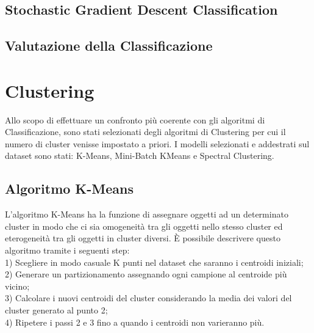 \documentclass[12pt,oneside]{article}
\begin{document}
    \begin{enumerate}
    \subsection{Stochastic Gradient Descent Classification}
    \end{enumerate}

   
    
    \begin{enumerate}
    \subsection{Valutazione della Classificazione}
    \end{enumerate}


\section{Clustering}
    \begin{justify}
        Allo scopo di effettuare un confronto più coerente con gli algoritmi di Classificazione, sono stati selezionati degli algoritmi di Clustering per cui il numero di cluster venisse impostato a priori. I modelli selezionati e addestrati sul dataset sono stati: K-Means, Mini-Batch KMeans e Spectral Clustering.
    \end{justify}
    \begin{enumerate}
    \subsection{Algoritmo K-Means}
    \begin{justify}
        L'algoritmo K-Means ha la funzione di assegnare oggetti ad un determinato cluster in modo che ci sia omogeneità tra gli oggetti nello stesso cluster ed eterogeneità tra gli oggetti in cluster diversi. È possibile descrivere questo algoritmo tramite i seguenti step:\\
    1) Scegliere in modo casuale K punti nel dataset che saranno i centroidi iniziali;\\
    2) Generare un partizionamento assegnando ogni campione al centroide più vicino;\\
    3) Calcolare i nuovi centroidi del cluster considerando la media dei valori del cluster generato al punto 2;\\
    4) Ripetere i passi 2 e 3 fino a quando i centroidi non varieranno più.
    \end{justify}
    \end{enumerate}
\end{document}
